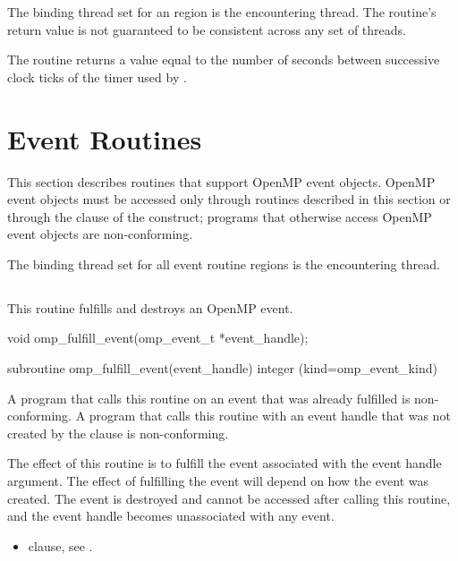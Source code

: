 \binding
The binding thread set for an  region is the encountering thread. The
routine's return value is not guaranteed to be consistent across any set of threads.

\effect
The  routine returns a value equal to the number of seconds between
successive clock ticks of the timer used by .

\section{Event Routines}
\label{sec:Event Routines}

This section describes routines that support OpenMP event objects. OpenMP event objects must be accessed only through routines described in this section or through the  clause of the  construct; programs that otherwise access OpenMP event objects are non-conforming.

\binding

The binding thread set for all event routine regions is the encountering thread.

\subsection{}
\label{subsec:omp_fulfill_event}
\summary
This routine fulfills and destroys an OpenMP event.

\format
\begin{ccppspecific}
\begin{ompcFunction}
void omp_fulfill_event(omp_event_t *event_handle);
\end{ompcFunction}
\end{ccppspecific}

\begin{fortranspecific}
\begin{ompfFunction}
subroutine omp_fulfill_event(event_handle)
integer (kind=omp_event_kind) 
\end{ompfFunction}
\end{fortranspecific}

\constraints

A program that calls this routine on an event that was already fulfilled is non-conforming.
A program that calls this routine with an event handle that was not created by the  clause is non-conforming.

\effect

The effect of this routine is to fulfill the event associated with the event handle argument. The effect of fulfilling the event will depend on how the event was created. The event is destroyed and cannot be accessed after calling this routine, and the event handle becomes unassociated with any event.

\crossreferences

\begin{itemize}
 \item {} clause, see .
\end{itemize}

